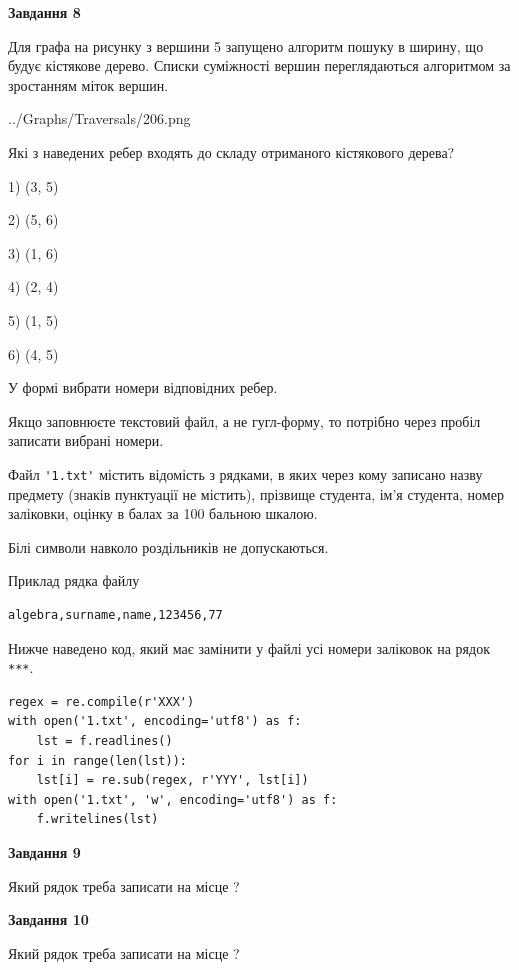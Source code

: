 \documentclass[12pt, ukrainian]{article}
\def\code#1{\Verb!#1!}
\begin{document}
{\begin {large}
{\begin {center}\textbf{Завдання 8}\end {center}}\par
Для графа на рисунку з вершини 5 запущено алгоритм пошуку в ширину, що будує кістякове дерево. Списки суміжності вершин переглядаються алгоритмом за зростанням міток вершин.\par
\begin{center}
	{../Graphs/Traversals/206.png}
\end{center}
\par Які з наведених ребер входять до складу отриманого кістякового дерева?\par
1) (3, 5)\par
2) (5, 6)\par
3) (1, 6)\par
4) (2, 4)\par
5) (1, 5)\par
6) (4, 5)\par
{\vskip 15pt} У формі вибрати номери відповідних ребер.


Якщо заповнюєте текстовий файл, а не гугл-форму, то потрібно через пробіл записа\-ти вибрані номери.\par
\newpage


Файл \code{'1.txt'} містить відомість з рядками, в яких через кому записа\-но назву предмету (знаків пунктуації не містить), прізвище студента, ім'я студента, номер залі\-ков\-ки, оцінку в балах за 100 бальною шкалою.

Білі символи навколо роздільників не допускаються.

Приклад рядка файлу



\begin{verbatim}
algebra,surname,name,123456,77
\end{verbatim}


Нижче наведено код, який має замінити у файлі усі номери заліковок на рядок \code{***}.



\begin{verbatim}
regex = re.compile(r'XXX')
with open('1.txt', encoding='utf8') as f:
    lst = f.readlines()
for i in range(len(lst)):
    lst[i] = re.sub(regex, r'YYY', lst[i])
with open('1.txt', 'w', encoding='utf8') as f:
    f.writelines(lst)
\end{verbatim}




{\begin {center}\textbf{Завдання 9}\end {center}}\par
Який рядок треба записати на місце  ?\par
\vspace{5mm}


{\begin {center}\textbf{Завдання 10}\end {center}}\par
Який рядок треба записати на місце  ?\par


\newpage


\end {large}}
\end{document}
